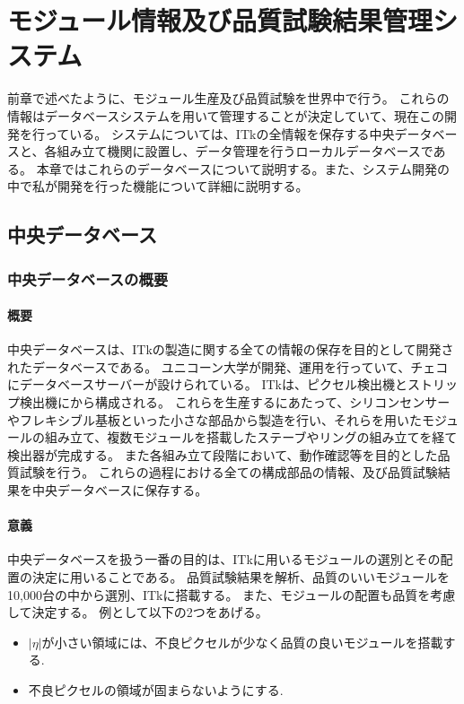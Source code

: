 \chapter{モジュール情報及び品質試験結果管理システム}\label{chap:dbsystem}
前章で述べたように、モジュール生産及び品質試験を世界中で行う。
これらの情報はデータベースシステムを用いて管理することが決定していて、現在この開発を行っている。
システムについては、ITkの全情報を保存する中央データベースと、各組み立て機関に設置し、データ管理を行うローカルデータベースである。
本章ではこれらのデータベースについて説明する。また、システム開発の中で私が開発を行った機能について詳細に説明する。

\section{中央データベース}
\subsection{中央データベースの概要}
\subsubsection{概要}
中央データベースは、ITkの製造に関する全ての情報の保存を目的として開発されたデータベースである。
ユニコーン大学が開発、運用を行っていて、チェコにデータベースサーバーが設けられている。
ITkは、ピクセル検出機とストリップ検出機にから構成される。
これらを生産するにあたって、シリコンセンサーやフレキシブル基板といった小さな部品から製造を行い、それらを用いたモジュールの組み立て、複数モジュールを搭載したステーブやリングの組み立てを経て検出器が完成する。
また各組み立て段階において、動作確認等を目的とした品質試験を行う。
これらの過程における全ての構成部品の情報、及び品質試験結果を中央データベースに保存する。

\subsubsection{意義}
中央データベースを扱う一番の目的は、ITkに用いるモジュールの選別とその配置の決定に用いることである。
品質試験結果を解析、品質のいいモジュールを10,000台の中から選別、ITkに搭載する。
また、モジュールの配置も品質を考慮して決定する。
例として以下の2つをあげる。
\begin{itemize}
  \item $|\eta|$が小さい領域には、不良ピクセルが少なく品質の良いモジュールを搭載する.
  \item 不良ピクセルの領域が固まらないようにする.
\end{itemize}

